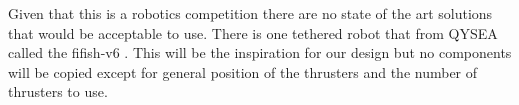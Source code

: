 Given that this is a robotics competition there are no state of the art solutions that would be acceptable to use. There is one tethered robot that from QYSEA called the fifish-v6 \cite{GYSEA}. This will be the inspiration for our design but no components will be copied except for general position of the thrusters and the number of thrusters to use.

